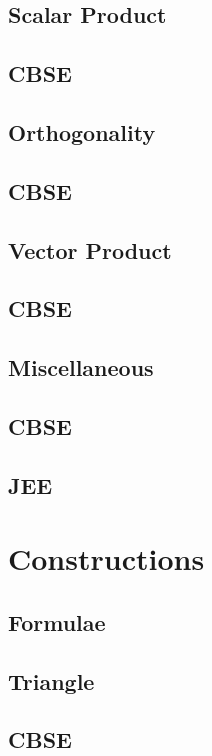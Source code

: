 \documentclass[journal]{IEEEtran}
\begin{document}
\subsection{Scalar Product}

\subsection{CBSE}

\subsection{Orthogonality}

\subsection{CBSE}

\subsection{Vector Product}

\subsection{CBSE}

\subsection{Miscellaneous}

\subsection{CBSE}

\subsection{JEE}

\newpage
\section{Constructions}
\subsection{Formulae}

\subsection{Triangle}

\subsection{CBSE}

\end{document}
